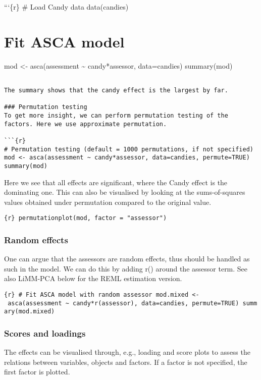 ```\{r\} \# Load Candy data data(candies)

\section{Fit ASCA model}\label{fit-asca-model}

mod \textless- asca(assessment \textasciitilde{} candy*assessor,
data=candies) summary(mod)

\begin{verbatim}

The summary shows that the candy effect is the largest by far. 

### Permutation testing
To get more insight, we can perform permutation testing of the factors. Here we use approximate permutation.

```{r}
# Permutation testing (default = 1000 permutations, if not specified)
mod <- asca(assessment ~ candy*assessor, data=candies, permute=TRUE)
summary(mod)
\end{verbatim}

Here we see that all effects are significant, where the Candy effect is
the dominating one. This can also be visualised by looking at the
sums-of-squares values obtained under permutation compared to the
original value.

\texttt{\{r\}\ permutationplot(mod,\ factor\ =\ "assessor")}

\subsubsection{Random effects}\label{random-effects}

One can argue that the assessors are random effects, thus should be
handled as such in the model. We can do this by adding r() around the
assessor term. See also LiMM-PCA below for the REML estimation version.

\texttt{\{r\}\ \#\ Fit\ ASCA\ model\ with\ random\ assessor\ mod.mixed\ \textless{}-\ asca(assessment\ \textasciitilde{}\ candy*r(assessor),\ data=candies,\ permute=TRUE)\ summary(mod.mixed)}

\subsubsection{Scores and loadings}\label{scores-and-loadings}

The effects can be visualised through, e.g., loading and score plots to
assess the relations between variables, objects and factors. If a factor
is not specified, the first factor is plotted.

